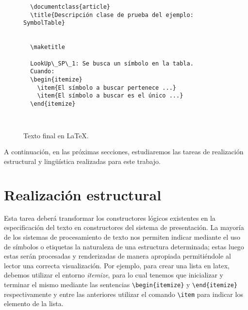 \begin{figure}[H]
  \begin{verbatim}
  \documentclass{article}
  \title{Descripción clase de prueba del ejemplo: SymbolTable}
  
  
  \maketitle

  LookUp\_SP\_1: Se busca un símbolo en la tabla.  
  Cuando:
  \begin{itemize}
    \item{El símbolo a buscar pertenece ...}
    \item{El símbolo a buscar es el único ...}   
  \end{itemize}
  
  
  \end{verbatim}
  \caption{Texto final en \LaTeX.}
  \label{fig:ej_latex}
\end{figure}

A continuación, en las próximas secciones, estudiaremos las tareas de realización estructural y lingüística realizadas para este trabajo.

\section{Realización estructural}
\label{cap:structure_realization}


Esta tarea deberá transformar los constructores lógicos existentes en la especificación del texto en constructores del sistema de presentación. La mayoría de los sistemas de procesamiento de texto nos permiten indicar mediante el uso de símbolos o etiquetas la naturaleza de una estructura determinada; estas luego estas serán procesadas y renderizadas de manera apropiada permitiéndole al lector una correcta visualización. Por ejemplo, para crear una lista en latex, debemos utilizar el entorno \emph{itemize}, para lo cual tenemos que inicializar y terminar el mismo mediante las sentencias \verb|\begin{itemize}| y \verb|\end{itemize}| respectivamente y entre las anteriores utilizar el comando \verb|\item| para indicar los elemento de la lista.

